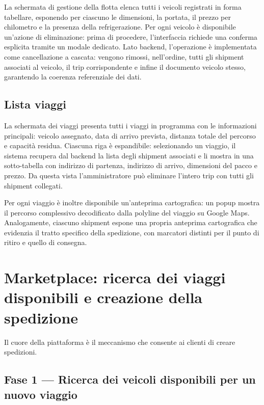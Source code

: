 La schermata di gestione della flotta elenca tutti i veicoli registrati in forma tabellare, esponendo per ciascuno le dimensioni, la portata, il prezzo per chilometro e la presenza della refrigerazione. Per ogni veicolo è disponibile un'azione di eliminazione: prima di procedere, l'interfaccia richiede una conferma esplicita tramite un modale dedicato. Lato backend, l'operazione è implementata come cancellazione a cascata: vengono rimossi, nell'ordine, tutti gli shipment associati al veicolo, il trip corrispondente e infine il documento veicolo stesso, garantendo la coerenza referenziale dei dati.

\subsection{Lista viaggi}

La schermata dei viaggi presenta tutti i viaggi in programma con le informazioni principali: veicolo assegnato, data di arrivo prevista, distanza totale del percorso e capacità residua. Ciascuna riga è espandibile: selezionando un viaggio, il sistema recupera dal backend la lista degli shipment associati e li mostra in una sotto-tabella con indirizzo di partenza, indirizzo di arrivo, dimensioni del pacco e prezzo. Da questa vista l'amministratore può eliminare l'intero trip con tutti gli shipment collegati.

Per ogni viaggio è inoltre disponibile un'anteprima cartografica: un popup mostra il percorso complessivo decodificato dalla polyline del viaggio su Google Maps. Analogamente, ciascuno shipment espone una propria anteprima cartografica che evidenzia il tratto specifico della spedizione, con marcatori distinti per il punto di ritiro e quello di consegna. 
\section{Marketplace: ricerca dei viaggi disponibili e creazione della spedizione}
\label{sec:marketplace}

Il cuore della piattaforma è il meccanismo che consente ai clienti di creare spedizioni.

\subsection{Fase 1 --- Ricerca dei veicoli disponibili per un nuovo viaggio}

